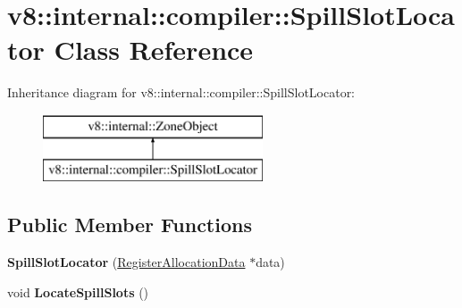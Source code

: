 \hypertarget{classv8_1_1internal_1_1compiler_1_1_spill_slot_locator}{}\section{v8\+:\+:internal\+:\+:compiler\+:\+:Spill\+Slot\+Locator Class Reference}
\label{classv8_1_1internal_1_1compiler_1_1_spill_slot_locator}
Inheritance diagram for v8\+:\+:internal\+:\+:compiler\+:\+:Spill\+Slot\+Locator\+:\begin{figure}[H]
\begin{center}
\leavevmode
\includegraphics[height=2.000000cm]{classv8_1_1internal_1_1compiler_1_1_spill_slot_locator}
\end{center}
\end{figure}
\subsection*{Public Member Functions}
\begin{DoxyCompactItemize}
\item 
{\bfseries Spill\+Slot\+Locator} (\hyperlink{classv8_1_1internal_1_1compiler_1_1_register_allocation_data}{Register\+Allocation\+Data} $\ast$data)\hypertarget{classv8_1_1internal_1_1compiler_1_1_spill_slot_locator_a5f8b231f0c7ab9da0a9e6a314c2e554a}{}\label{classv8_1_1internal_1_1compiler_1_1_spill_slot_locator_a5f8b231f0c7ab9da0a9e6a314c2e554a}

\item 
void {\bfseries Locate\+Spill\+Slots} ()\hypertarget{classv8_1_1internal_1_1compiler_1_1_spill_slot_locator_a385cfd36b37f8ad2333eaa8b5cd4ec27}{}\label{classv8_1_1internal_1_1compiler_1_1_spill_slot_locator_a385cfd36b37f8ad2333eaa8b5cd4ec27}

\end{DoxyCompactItemize}
